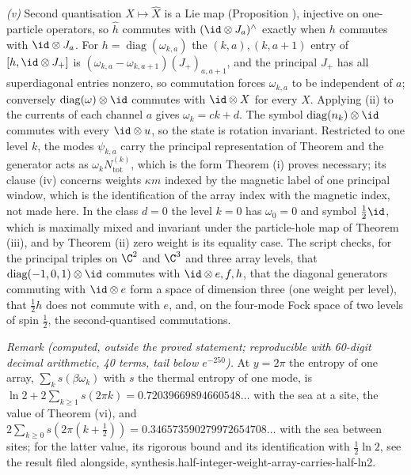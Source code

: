 \emph{(v)} Second quantisation $X \mapsto \hat{X}$ is a Lie map (Proposition ), injective on one-particle operators, so $\hat{h}$ commutes with $(\id \otimes J_{a})^{\wedge}$ exactly when $h$ commutes with $\id \otimes J_{a}$. For $h = \operatorname{diag}(\omega_{k,a})$ the $(k,a),(k,a+1)$ entry of $[h, \id \otimes J_{+}]$ is $(\omega_{k,a} - \omega_{k,a+1})(J_{+})_{a,a+1}$, and the principal $J_{+}$ has all superdiagonal entries nonzero, so commutation forces $\omega_{k,a}$ to be independent of $a$; conversely $\operatorname{diag}(\omega) \otimes \id$ commutes with $\id \otimes X$ for every $X$. Applying (ii) to the currents of each channel $a$ gives $\omega_{k} = ck + d$. The symbol $\operatorname{diag}(n_{k}) \otimes \id$ commutes with every $\id \otimes u$, so the state is rotation invariant. Restricted to one level $k$, the modes $\psi_{k,a}$ carry the principal representation of Theorem  and the generator acts as $\omega_{k}N_{\mathrm{tot}}^{(k)}$, which is the form Theorem (i) proves necessary; its clause (iv) concerns weights $\kappa m$ indexed by the magnetic label of one principal window, which is the identification of the array index with the magnetic index, not made here. In the class $d = 0$ the level $k = 0$ has $\omega_{0} = 0$ and symbol $\tfrac12\id$, which is maximally mixed and invariant under the particle-hole map of Theorem (iii), and by Theorem (ii) zero weight is its equality case. The script checks, for the principal triples on $\C^{2}$ and $\C^{3}$ and three array levels, that $\operatorname{diag}(-1, 0, 1) \otimes \id$ commutes with $\id \otimes e, f, h$, that the diagonal generators commuting with $\id \otimes e$ form a space of dimension three (one weight per level), that $\tfrac12 h$ does not commute with $e$, and, on the four-mode Fock space of two levels of spin $\tfrac12$, the second-quantised commutations.

\emph{Remark (computed, outside the proved statement; reproducible with 60-digit decimal arithmetic, 40 terms, tail below $e^{-250}$).} At $y = 2\pi$ the entropy of one array, $\sum_{k}s(\beta\omega_{k})$ with $s$ the thermal entropy of one mode, is $\ln 2 + 2\sum_{k \geq 1}s(2\pi k) = 0.72039669894660548\ldots$ with the sea at a site, the value of Theorem (vi), and $2\sum_{k \geq 0}s(2\pi(k + \tfrac12)) = 0.346573590279972654708\ldots$ with the sea between sites; for the latter value, its rigorous bound and its identification with $\tfrac12\ln 2$, see the result filed alongside, synthesis.half-integer-weight-array-carries-half-ln2.
